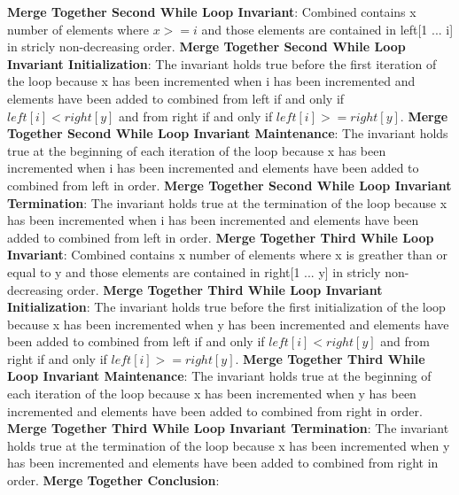 \documentclass[onecolumn, 12pt, article]{IEEEtran}
\numberwithin{case}{problem}
\numberwithin{condition}{problem}
\numberwithin{condition}{subsection}
\numberwithin{definition}{section}
\theoremstyle{remark}
\numberwithin{question}{problem}
\theoremstyle{plain}
\numberwithin{answer}{problem}
\numberwithin{solution}{section}
\numberwithin{equation}{section}%
\begin{document}
\newline
\newline
\textbf{Merge Together Second While Loop Invariant}: Combined contains x number of elements where $x >= i$ and those elements are contained in left[1 ... i] in stricly non-decreasing order.
\newline
\textbf{Merge Together Second While Loop Invariant Initialization}: The invariant holds true before the first iteration of the loop because x has been incremented when i has been incremented and elements have been added to combined from left if and only if $left[i] < right[y]$ and from right if and only if $left[i] >= right[y]$.
\newline
\textbf{Merge Together Second While Loop Invariant Maintenance}: The invariant holds true at the beginning of each iteration of the loop because x has been incremented when i has been incremented and elements have been added to combined from left in order.
\newline
\textbf{Merge Together Second While Loop Invariant Termination}: The invariant holds true at the termination of the loop because x has been incremented when i has been incremented and elements have been added to combined from left in order.
\newline
\newline
\textbf{Merge Together Third While Loop Invariant}: Combined contains x number of elements where x is greather than or equal to y and those elements are contained in right[1 ... y] in stricly non-decreasing order.
\newline
\textbf{Merge Together Third While Loop Invariant Initialization}: The invariant holds true before the first initialization of the loop because x has been incremented when y has been incremented and elements have been added to combined from left if and only if $left[i] < right[y]$ and from right if and only if $left[i] >= right[y]$.
\newline
\textbf{Merge Together Third While Loop Invariant Maintenance}: The invariant holds true at the beginning of each iteration of the loop because x has been incremented when y has been incremented and elements have been added to combined from right in order.
\newline
\textbf{Merge Together Third While Loop Invariant Termination}: The invariant holds true at the termination of the loop because x has been incremented when y has been incremented and elements have been added to combined from right in order.
\newline
\newline
\textbf{Merge Together Conclusion}: %
\newline
\newline
\end{document}
